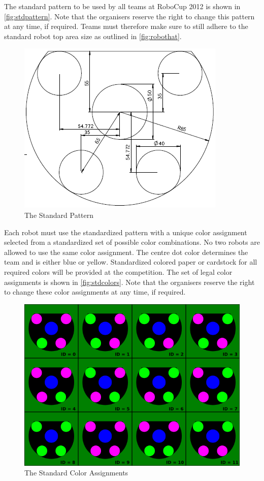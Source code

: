 The standard pattern to be used by all teams at RoboCup 2012 is shown in \autoref{fig:stdpattern}.
Note that the organisers reserve the right to change this pattern at any time, if required.
Teams must therefore make sure to still adhere to the standard robot top area size as outlined in \autoref{fig:robothat}.

\begin{figure}[ht] %
	\centering
	\includegraphics[width=0.8\columnwidth]{img/standard_pattern2010.png}
	\caption{The Standard Pattern}
	\label{fig:stdpattern}
\end{figure}

Each robot must use the standardized pattern with a unique color assignment selected from a standardized set of possible color combinations.
No two robots are allowed to use the same color assignment.
The centre dot color determines the team and is either blue or yellow.
Standardized colored paper or cardstock for all required colors will be provided at the competition.
The set of legal color assignments is shown in \autoref{fig:stdcolors}.
Note that the organisers reserve the right to change these color assignments at any time, if required.

\begin{figure}[ht] %
	\centering
	\includegraphics[width=1.0\columnwidth]{img/standard_colors2010.png}
	\caption{The Standard Color Assignments}
	\label{fig:stdcolors}
\end{figure}

